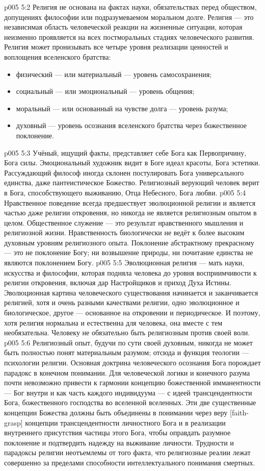 \vs p005 5:2 Религия не основана на фактах науки, обязательствах перед обществом, допущениях философии или подразумеваемом моральном долге. Религия --- это независимая область человеческой реакции на жизненные ситуации, которая неизменно проявляется на всех постморальных стадиях человеческого развития. Религия может пронизывать все четыре уровня реализации ценностей и воплощения вселенского братства: \begin{itemize}\item физический --- или материальный --- уровень самосохранения; \item социальный --- или эмоциональный --- уровень общения; \item моральный --- или основанный на чувстве долга --- уровень разума; \item духовный --- уровень осознания вселенского братства через божественное поклонение.\end{itemize}
\vs p005 5:3 Учёный, ищущий факты, представляет себе Бога как Первопричину, Бога силы. Эмоциональный художник видит в Боге идеал красоты, Бога эстетики. Рассуждающий философ иногда склонен постулировать Бога универсального единства, даже пантеистическое Божество. Религиозный верующий человек верит в Бога, способствующего выживанию, Отца Небесного, Бога любви.
\vs p005 5:4 \pc Нравственное поведение всегда предшествует эволюционной религии и является частью даже религии откровения, но никогда не является религиозным опытом в целом. Общественное служение --- это результат нравственного мышления и религиозной жизни. Нравственность биологически не ведёт к более высоким духовным уровням религиозного опыта. Поклонение абстрактному прекрасному --- это не поклонение Богу; ни возвышение природы, ни почитание единства не являются поклонением Богу.
\vs p005 5:5 Эволюционная религия --- мать науки, искусства и философии, которая подняла человека до уровня восприимчивости к религии откровения, включая дар Настройщиков и приход Духа Истины. Эволюционная картина человеческого существования начинается и заканчивается религией, хотя и очень разными качествами религии, одно эволюционное и биологическое, другое --- основанное на откровении и периодическое. И поэтому, хотя религия нормальна и естественна для человека, она вместе с тем необязательна. Человеку не обязательно быть религиозным против своей воли.
\vs p005 5:6 \pc Религиозный опыт, будучи по сути своей духовным, никогда не может быть полностью понят материальным разумом; отсюда и функция теологии --- психологии религии. Основная доктрина человеческого осознания Бога порождает парадокс в конечном понимании. Для человеческой логики и конечного разума почти невозможно привести к гармонии концепцию божественной имманентности --- Бог внутри и как часть каждого индивидуума --- с идеей трансцендентности Бога, божественного господства во вселенной вселенных. Эти две существенные концепции Божества должны быть объединены в понимании через веру [faith\hyp{}grasp] концепции трансцендентности личностного Бога и в реализации внутреннего присутствия частицы этого Бога, чтобы оправдать разумное поклонение и подтвердить надежду на выживание личности. Трудности и парадоксы религии неотъемлемы от того факта, что религиозные реалии лежат совершенно за пределами способности интеллектуального понимания смертных.
